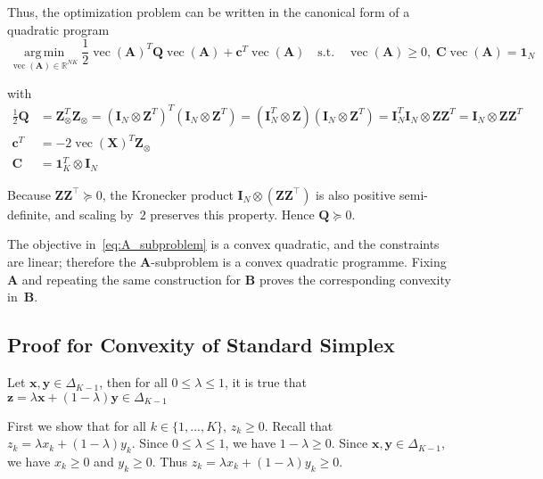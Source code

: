 \documentclass[oneside]{article}
\DeclareMathOperator*{\argmin}{arg\,min}
\begin{document}
Thus, the optimization problem can be written in the canonical form of a quadratic program
\begin{equation}
    \underset{\operatorname{vec}(\mathbf{A}) \in \mathbb{R}^{NK}}{\argmin}
    \frac{1}{2} \operatorname{vec}(\mathbf{A})^T \mathbf{Q} \operatorname{vec}(\mathbf{A}) + \mathbf{c}^T \operatorname{vec}(\mathbf{A})
    \quad\text{s.t.}\quad
    \operatorname{vec}(\mathbf{A}) \geq 0, \;
    \mathbf{C} \operatorname{vec}(\mathbf{A}) = \mathbf{1}_N
\end{equation}

with
\begin{equation}
    \begin{aligned}
        \frac{1}{2} \mathbf{Q} &= \mathbf{Z}_{\otimes}^T \mathbf{Z}_{\otimes}
        = (\mathbf{I}_N \otimes \mathbf{Z}^T)^T (\mathbf{I}_N \otimes \mathbf{Z}^T)
        = (\mathbf{I}_N^T \otimes \mathbf{Z}) (\mathbf{I}_N \otimes \mathbf{Z}^T)
        = \mathbf{I}_N^T \mathbf{I}_N \otimes \mathbf{Z} \mathbf{Z}^T
        = \mathbf{I}_N \otimes \mathbf{Z} \mathbf{Z}^T
        \\
        \mathbf{c}^T &= - 2 \operatorname{vec}(\mathbf{X})^T \mathbf{Z}_{\otimes} \\
        \mathbf{C} &= \mathbf{1}_K^T \otimes \mathbf{I}_N
    \end{aligned}
\end{equation}

Because $\mathbf Z\mathbf Z^{\!\top}\succeq0$, the Kronecker product $\mathbf I_N\otimes(\mathbf Z\mathbf Z^{\!\top})$ is also positive semi-definite, and scaling by~\(2\) preserves this property. Hence $\mathbf{Q} \succeq 0$.

The objective in~\eqref{eq:A_subproblem} is a convex quadratic, and the constraints are linear; therefore the $\mathbf{A}$-subproblem is a convex quadratic programme. Fixing $\mathbf{A}$ and repeating the same construction for
$\mathbf{B}$ proves the corresponding convexity in~$\mathbf{B}$.

\subsection{Proof for Convexity of Standard Simplex}
\label{subsec:convexity_simplex}

Let $\mathbf{x}, \mathbf{y} \in \Delta_{K-1}$, then for all $0 \leq \lambda \leq 1$, it is true that $\mathbf{z}=\lambda \mathbf{x} + (1-\lambda) \mathbf{y} \in \Delta_{K-1}$

First we show that for all $k \in \{1, ..., K\}$, $z_k \geq 0$. Recall that $z_k = \lambda x_k + (1-\lambda) y_k$. Since $0 \leq \lambda \leq 1$, we have $1-\lambda \geq 0$. Since $\mathbf{x}, \mathbf{y} \in \Delta_{K-1}$, we have $x_k \geq 0$ and $y_k \geq 0$. Thus $z_k = \lambda x_k + (1-\lambda) y_k \geq 0$.
\end{document}
